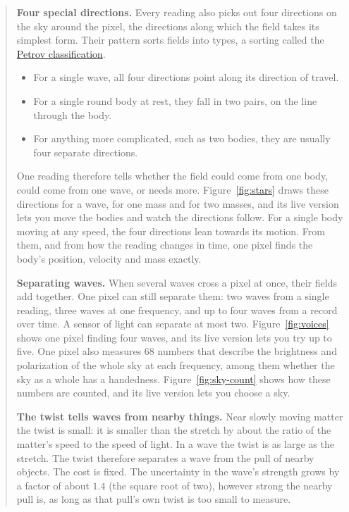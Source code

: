\begin{quote}
\textbf{Four special directions.} Every reading also picks out four directions
on the sky around the pixel, the directions along which the field takes its
simplest form. Their pattern sorts fields into types, a sorting called the
\href{https://en.wikipedia.org/wiki/Petrov_classification}{Petrov
classification}.
\begin{itemize}
\item For a single wave, all four directions point along its direction of
travel.
\item For a single round body at rest, they fall in two pairs, on the line
through the body.
\item For anything more complicated, such as two bodies, they are usually four
separate directions.
\end{itemize}
One reading therefore tells whether the field could come from one body, could
come from one wave, or needs more. Figure~\ref{fig:stars} draws these directions for a wave, for one mass and for two masses, and its live version lets you move the bodies and watch the directions follow. For a single body moving at any speed, the
four directions lean towards its motion. From them, and from how the reading
changes in time, one pixel finds the body's position, velocity and mass
exactly.

\textbf{Separating waves.} When several waves cross a pixel at once, their
fields add together. One pixel can still separate them: two waves from a single
reading, three waves at one frequency, and up to four waves from a record over
time. A sensor of light can separate at most two. Figure~\ref{fig:voices} shows one pixel finding four waves, and its live version lets you try up to five. One pixel also measures 68
numbers that describe the brightness and polarization of the whole sky at each
frequency, among them whether the sky as a whole has a handedness. Figure~\ref{fig:sky-count} shows how these numbers are counted, and its live version lets you choose a sky.

\textbf{The twist tells waves from nearby things.} Near slowly moving matter the
twist is small: it is smaller than the stretch by about the ratio of the
matter's speed to the speed of light. In a wave the twist is as large as the
stretch. The twist therefore separates a wave from the pull of nearby objects.
The cost is fixed. The uncertainty in the wave's strength grows by a factor of
about $1.4$ (the square root of two), however strong the nearby pull is, as
long as that pull's own twist is too small to measure.


\end{quote}
